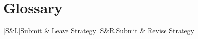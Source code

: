 \newcommand\thesistypedebug{}
\newcommand\thesistitle{Masterthesis}
\newcommand\thesisdate{July 31, 2017}




\let\chapter\section 
\let\section\subsection 
\let\subsection\subsubsection 


	\frontmatter	
		\pagestyle{empty}	
			 
			
			
			
			 
		
	\mainmatter
		\pagestyle{scrheadings}
			


	\appendix
	\pagestyle{scrheadings}
			
			\clearpage
				 
	\backmatter
		\pagestyle{empty}
			\chapter{Glossary}
				\begin{acronym}
					[S\&L]{Submit \& Leave Strategy}	
					[S\&R]{Submit \& Revise Strategy}	
				\end{acronym}
			
			
			
